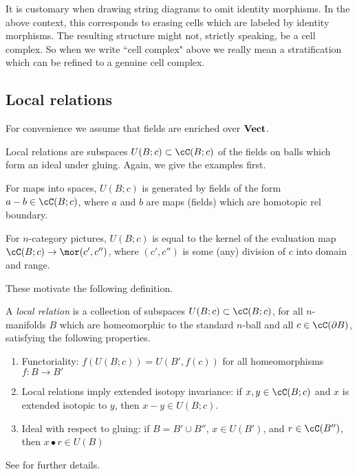 It is customary when drawing string diagrams to omit identity morphisms.
In the above context, this corresponds to erasing cells which are labeled by identity morphisms.
The resulting structure might not, strictly speaking, be a cell complex.
So when we write ``cell complex" above we really mean a stratification which can be
refined to a genuine cell complex.



\subsection{Local relations}
\label{sec:local-relations}

For convenience we assume that fields are enriched over $\text{\textbf{Vect}}$.

Local relations are subspaces $U(B; c)\sub \cC(B; c)$ of the fields on balls which form an ideal under gluing.
Again, we give the examples first.

\addtocounter{subsection}{-2}
\begin{example}[contd.]
For maps into spaces, $U(B; c)$ is generated by fields of the form $a-b \in \lf(B; c)$,
where $a$ and $b$ are maps (fields) which are homotopic rel boundary.
\end{example}

\begin{example}[contd.]
For $n$-category pictures, $U(B; c)$ is equal to the kernel of the evaluation map
$\lf(B; c) \to \mor(c', c'')$, where $(c', c'')$ is some (any) division of $c$ into
domain and range.
\end{example}
\addtocounter{subsection}{2}
\addtocounter{prop}{-2}

These motivate the following definition.

\begin{defn}
A {\it local relation} is a collection of subspaces $U(B; c) \sub \lf(B; c)$,
for all $n$-manifolds $B$ which are
homeomorphic to the standard $n$-ball and all $c \in \cC(\bd B)$, 
satisfying the following properties.
\begin{enumerate}
\item Functoriality: 
$f(U(B; c)) = U(B', f(c))$ for all homeomorphisms $f: B \to B'$
\item Local relations imply extended isotopy invariance: 
if $x, y \in \cC(B; c)$ and $x$ is extended isotopic 
to $y$, then $x-y \in U(B; c)$.
\item Ideal with respect to gluing:
if $B = B' \cup B''$, $x\in U(B')$, and $r\in \cC(B'')$, then $x\bullet r \in U(B)$
\end{enumerate}
\end{defn}
See \cite{kw:tqft} for further details.


